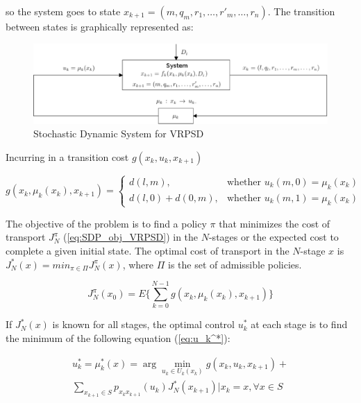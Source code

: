 so the system goes to state $x_{k+1} = (m,q_m,r_1,\ldots,r'_m,\ldots,r_n)$. The transition between states is graphically represented as:

\begin{figure}[!htbp]
  \begin{center}
   \includegraphics[width=1\textwidth]{Images/Chapter2/System_SDP.eps}
  \end{center}
    \caption{Stochastic Dynamic System for VRPSD}\label{fig:SDPS_VRPSD}
\end{figure}

Incurring in a transition cost $g(x_k,u_k,x_{k+1})$

\begin{equation}\label{eq:costg}
    g(x_k,\mu_k(x_k),x_{k+1}) = \left \{ \begin{array}{ll}
    d(l,m), & \text{whether } u_k(m,0)=\mu_k(x_k)\\
    d(l,0) + d(0,m), & \text{whether } u_k(m,1)=\mu_k(x_k)
    \end{array} \right.
 \end{equation}

The objective of the problem is to find a policy $\pi$ that minimizes the cost of transport $J_N^\pi$ (\ref{eq:SDP_obj_VRPSD}) in the $N$-stages or the expected cost to complete a given initial state. The optimal cost of transport in the $N$-stage $x$ is  $J_N^*(x) = min_{\pi\in \Pi}J_N^\pi(x)$, where $\Pi$ is the set of admissible policies. 

\begin{equation}\label{eq:SDP_obj_VRPSD}
 J_N^\pi(x_0)=E\biggr\{\sum_{k=0}^{N-1}g(x_k,\mu_k(x_k),x_{k+1})\biggr\}
\end{equation}

If $J_N^*(x)$ is known for all stages, the optimal control $u_k^*$ at each stage is to find the minimum of the following equation (\ref{eq:u_k^*}):

\begin{multline}\label{eq:u_k^*}
     u_k^*=\mu_k^*(x)=
\arg\min\limits_{u_k \in U_k(x_k)}g(x_k,u_k,x_{k+1})+\\
\sum_{x_{k+1}\in S}p_{x_kx_{k+1}}(u_k)J_N^*(x_{k+1})|x_k=x, \forall x\in S
\end{multline}

